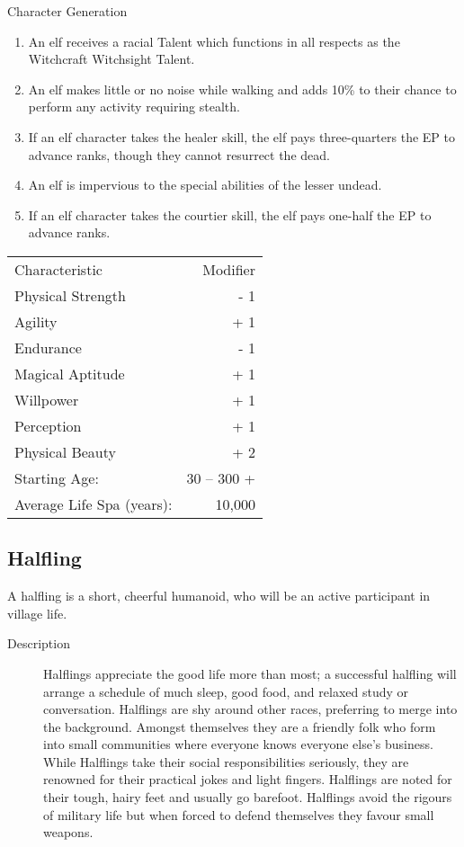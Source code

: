 \begin{Chapter}{Character Generation}
\begin{enumerate}
\item An elf receives a racial Talent which functions in all respects
  as the Witchcraft Witchsight Talent.

\item An elf makes little or no noise while walking and adds 10\% to
  their chance to perform any activity requiring stealth.

\item If an elf character takes the healer skill, the elf pays
  three-quarters the EP to advance ranks, though they cannot resurrect
  the dead.

\item An elf is impervious to the special abilities of the lesser
  undead.

\item If an elf character takes the courtier skill, the elf pays
  one-half the EP to advance ranks.
\end{enumerate}
  
\begin{tabularx}{\columnwidth}{Xr}
Characteristic			& Modifier \\
Physical Strength		& - 1 \\
Agility				& + 1 \\
Endurance			& - 1 \\ 
Magical Aptitude		& + 1 \\
Willpower			& + 1 \\
Perception			& + 1 \\
Physical Beauty			& + 2 \\
Starting Age:			& 30 -- 300 + \\
Average Life Spa (years):	& ~ 10,000 \\
\end{tabularx}

\subsection{Halfling}

A halfling is a short, cheerful humanoid, who will be an active
participant in village life.

\begin{description}
\item[Description] Halflings appreciate the good life more than most;
  a successful halfling will arrange a schedule of much sleep, good
  food, and relaxed study or conversation.  Halflings are shy around
  other races, preferring to merge into the background.  Amongst
  themselves they are a friendly folk who form into small communities
  where everyone knows everyone else’s business.  While Halflings take
  their social responsibilities seriously, they are renowned for their
  practical jokes and light fingers.  Halflings are noted for their
  tough, hairy feet and usually go barefoot.  Halflings avoid the
  rigours of military life but when forced to defend themselves they
  favour small weapons.
\end{description}


\end{Chapter}
